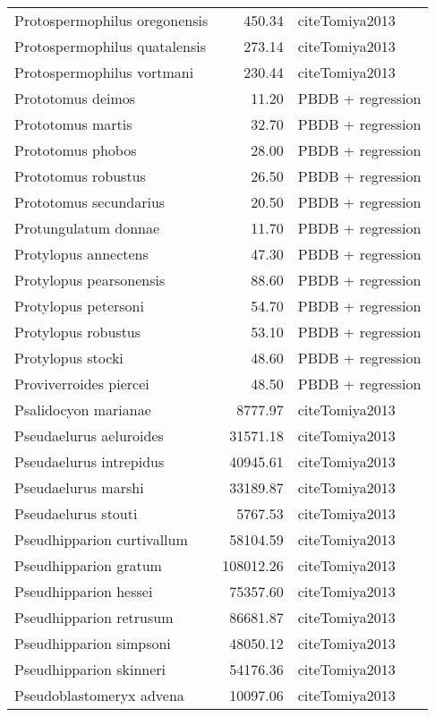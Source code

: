 \begin{table}[ht]
\begin{tabular}{lrl}
  Protospermophilus oregonensis & 450.34 & cite{Tomiya2013} \\ 
  Protospermophilus quatalensis & 273.14 & cite{Tomiya2013} \\ 
  Protospermophilus vortmani & 230.44 & cite{Tomiya2013} \\ 
  Prototomus deimos & 11.20 & PBDB + regression \\ 
  Prototomus martis & 32.70 & PBDB + regression \\ 
  Prototomus phobos & 28.00 & PBDB + regression \\ 
  Prototomus robustus & 26.50 & PBDB + regression \\ 
  Prototomus secundarius & 20.50 & PBDB + regression \\ 
  Protungulatum donnae & 11.70 & PBDB + regression \\ 
  Protylopus annectens & 47.30 & PBDB + regression \\ 
  Protylopus pearsonensis & 88.60 & PBDB + regression \\ 
  Protylopus petersoni & 54.70 & PBDB + regression \\ 
  Protylopus robustus & 53.10 & PBDB + regression \\ 
  Protylopus stocki & 48.60 & PBDB + regression \\ 
  Proviverroides piercei & 48.50 & PBDB + regression \\ 
  Psalidocyon marianae & 8777.97 & cite{Tomiya2013} \\ 
  Pseudaelurus aeluroides & 31571.18 & cite{Tomiya2013} \\ 
  Pseudaelurus intrepidus & 40945.61 & cite{Tomiya2013} \\ 
  Pseudaelurus marshi & 33189.87 & cite{Tomiya2013} \\ 
  Pseudaelurus stouti & 5767.53 & cite{Tomiya2013} \\ 
  Pseudhipparion curtivallum & 58104.59 & cite{Tomiya2013} \\ 
  Pseudhipparion gratum & 108012.26 & cite{Tomiya2013} \\ 
  Pseudhipparion hessei & 75357.60 & cite{Tomiya2013} \\ 
  Pseudhipparion retrusum & 86681.87 & cite{Tomiya2013} \\ 
  Pseudhipparion simpsoni & 48050.12 & cite{Tomiya2013} \\ 
  Pseudhipparion skinneri & 54176.36 & cite{Tomiya2013} \\ 
  Pseudoblastomeryx advena & 10097.06 & cite{Tomiya2013} \\ 

\end{tabular}
\end{table}
